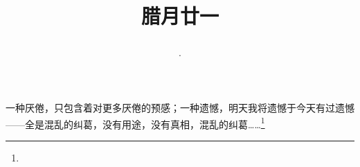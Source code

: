 \title{\date[d=31,m=1,y=2024][year:cn-y,年,month:cn,day:cn,日,·,weekday]·腊月廿一 }
一种厌倦，只包含着对更多厌倦的预感；一种遗憾，明天我将遗憾于今天有过遗憾——全是混乱的纠葛，没有用途，没有真相，混乱的纠葛……\footnote{ }

